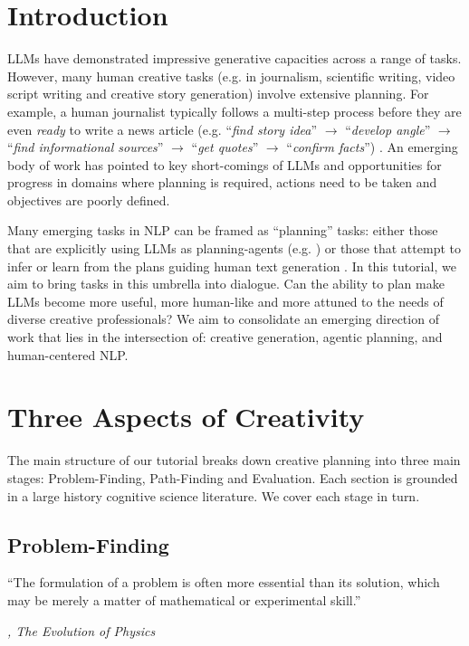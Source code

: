 \documentclass[11pt]{article}
\begin{document}
\section{Introduction}

LLMs have demonstrated impressive generative capacities across a range of tasks. However, many human creative tasks (e.g. in journalism, scientific writing, video script writing and creative story generation) involve extensive planning. For example, a human journalist typically follows a multi-step process before they are even \textit{ready} to write a news article (e.g. ``\textit{find story idea}'' $\rightarrow$ ``\textit{develop angle}'' $\rightarrow$ ``\textit{find informational sources}'' $\rightarrow$ ``\textit{get quotes}'' $\rightarrow$ ``\textit{confirm facts}'') \cite{cohen2011computational}. An emerging body of work has pointed to key short-comings of LLMs and opportunities for progress in domains where planning is required, actions need to be taken and objectives are poorly defined. 

Many emerging tasks in NLP can be framed as ``planning'' tasks: either those that are explicitly using LLMs as planning-agents (e.g. \cite{zhou2023webarena}) or those that attempt to infer or learn from the plans guiding human text generation \cite{spangher2024pressrelease}. In this tutorial, we aim to bring tasks in this umbrella into dialogue. Can the ability to plan make LLMs become more useful, more human-like and more attuned to the needs of diverse creative professionals? We aim to consolidate an emerging direction of work that lies in the intersection of: creative generation, agentic planning, and human-centered NLP.

\section{Three Aspects of Creativity}

The main structure of our tutorial breaks down creative planning into three main stages: Problem-Finding, Path-Finding and Evaluation. Each section is grounded in a large history cognitive science literature. We cover each stage in turn.

\subsection{Problem-Finding}

\epigraph{
``The formulation of a problem is often more essential than its solution, which may be merely a matter of mathematical or experimental skill.''
}{\textit{, \textit{The Evolution of Physics}}}
\end{document}
